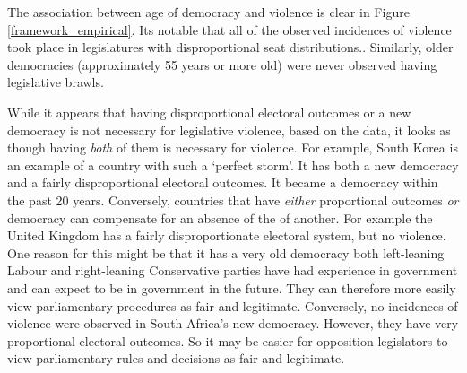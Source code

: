 \documentclass[a4paper]{article}\usepackage{graphicx, color}
\begin{document}
The association between age of democracy and violence is clear in Figure \ref{framework_empirical}. Its notable that all of the observed incidences of violence took place in legislatures with disproportional seat distributions.. Similarly, older democracies (approximately 55 years or more old) were never observed having legislative brawls.

While it appears that having disproportional electoral outcomes or a new democracy is not necessary for legislative violence, based on the data, it looks as though having \emph{both} of them is necessary for violence. For example, South Korea is an example of a country with such a ‘perfect storm’. It has both a new democracy and a fairly disproportional electoral outcomes. It became a democracy within the past 20 years. Conversely, countries that have \emph{either} proportional outcomes \emph{or} democracy can compensate for an absence of the of another. For example the United Kingdom has a fairly disproportionate electoral system, but no violence. One reason for this might be that it has a very old democracy both left-leaning Labour and right-leaning Conservative parties have had experience in government and can expect to be in government in the future. They can therefore more easily view parliamentary procedures as fair and legitimate. Conversely, no incidences of violence were observed in South Africa's new democracy. However, they have very proportional electoral outcomes. So it may be easier for opposition legislators to view parliamentary rules and decisions as fair and legitimate.
\end{document}
